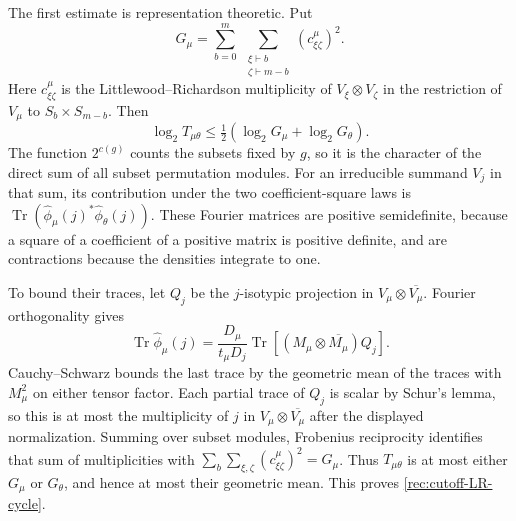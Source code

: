 The first estimate is representation theoretic.  Put
\[
 G_\mu=\sum_{b=0}^m\ \sum_{\substack{\xi\vdash b\\\zeta\vdash m-b}}
              (c_{\xi\zeta}^\mu)^2.
\]
Here $c_{\xi\zeta}^\mu$ is the Littlewood--Richardson multiplicity of
$V_\xi\otimes V_\zeta$ in the restriction of $V_\mu$ to
$S_b\times S_{m-b}$.  Then
\begin{equation}\label{rec:cutoff-LR-cycle}
 \log_2T_{\mu\theta}\le
               \tfrac12(\log_2G_\mu+\log_2G_\theta).
\end{equation}
The function $2^{c(g)}$ counts the subsets fixed by $g$, so it is
the character of the direct sum of all subset permutation modules.
For an irreducible summand $V_j$ in that sum, its contribution under
the two coefficient-square laws is
$\operatorname{Tr}(\widehat\phi_\mu(j)^*
\widehat\phi_\theta(j))$.  These Fourier matrices are positive
semidefinite, because a square of a coefficient of a positive matrix
is positive definite, and are contractions because the densities
integrate to one.

To bound their traces, let $Q_j$ be the $j$-isotypic projection in
$V_\mu\otimes\overline{V_\mu}$.  Fourier orthogonality gives
\[
 \operatorname{Tr}\widehat\phi_\mu(j)
 =\frac{D_\mu}{t_\mu D_j}
       \operatorname{Tr}[(M_\mu\otimes\overline{M_\mu})Q_j].
\]
Cauchy--Schwarz bounds the last trace by the geometric mean of the
traces with $M_\mu^2$ on either tensor factor.  Each partial trace of
$Q_j$ is scalar by Schur's lemma, so this is at most the multiplicity
of $j$ in $V_\mu\otimes\overline{V_\mu}$ after the displayed
normalization.  Summing over subset modules, Frobenius reciprocity
identifies that sum of multiplicities with
$\sum_b\sum_{\xi,\zeta}(c_{\xi\zeta}^\mu)^2=G_\mu$.
Thus $T_{\mu\theta}$ is at most either $G_\mu$ or $G_\theta$,
and hence at most their geometric mean.  This proves
\eqref{rec:cutoff-LR-cycle}.


